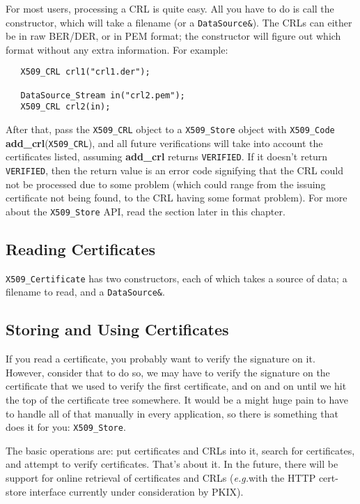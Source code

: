 \documentclass{article}
\newcommand{\function}[1]{\textbf{#1}}
\newcommand{\type}[1]{\texttt{#1}}
\newcommand{\eg}[0]{\emph{e.g.}}
\begin{document}
For most users, processing a CRL is quite easy. All you have to do is call the
constructor, which will take a filename (or a \type{DataSource\&}). The CRLs
can either be in raw BER/DER, or in PEM format; the constructor will figure out
which format without any extra information. For example:

\begin{verbatim}
   X509_CRL crl1("crl1.der");

   DataSource_Stream in("crl2.pem");
   X509_CRL crl2(in);
\end{verbatim}

After that, pass the \type{X509\_CRL} object to a \type{X509\_Store} object
with \type{X509\_Code} \function{add\_crl}(\type{X509\_CRL}), and all future
verifications will take into account the certificates listed, assuming
\function{add\_crl} returns \type{VERIFIED}. If it doesn't return
\type{VERIFIED}, then the return value is an error code signifying that the CRL
could not be processed due to some problem (which could range from the issuing
certificate not being found, to the CRL having some format problem). For more
about the \type{X509\_Store} API, read the section later in this chapter.

\subsection{Reading Certificates}

\type{X509\_Certificate} has two constructors, each of which takes a source of
data; a filename to read, and a \type{DataSource\&}.

\subsection{Storing and Using Certificates}

If you read a certificate, you probably want to verify the signature on
it. However, consider that to do so, we may have to verify the signature on the
certificate that we used to verify the first certificate, and on and on until
we hit the top of the certificate tree somewhere. It would be a might huge pain
to have to handle all of that manually in every application, so there is
something that does it for you: \type{X509\_Store}.

The basic operations are: put certificates and CRLs into it, search
for certificates, and attempt to verify certificates. That's about
it. In the future, there will be support for online retrieval of
certificates and CRLs (\eg with the HTTP cert-store interface
currently under consideration by PKIX).
\end{document}
